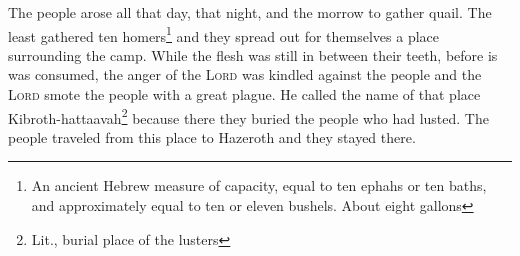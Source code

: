 \begin{enumerate}[align=center]
     The people arose all that day, that night, and the morrow to gather quail. The least gathered ten homers\footnote{An ancient Hebrew measure of capacity, equal to ten ephahs or ten baths, and approximately equal to ten or eleven bushels. About eight gallons} and they spread out for themselves a place surrounding the camp.%
     While the flesh was still in between their teeth, before is was consumed, the anger of the \textsc{Lord} was kindled against the people and the \textsc{Lord} smote the people with a great plague.%
     He called the name of that place Kibroth-hattaavah\footnote{Lit., burial place of the lusters} because there they buried the people who had lusted.%
     The people traveled from this place to Hazeroth and they stayed there.%
\end{enumerate}
